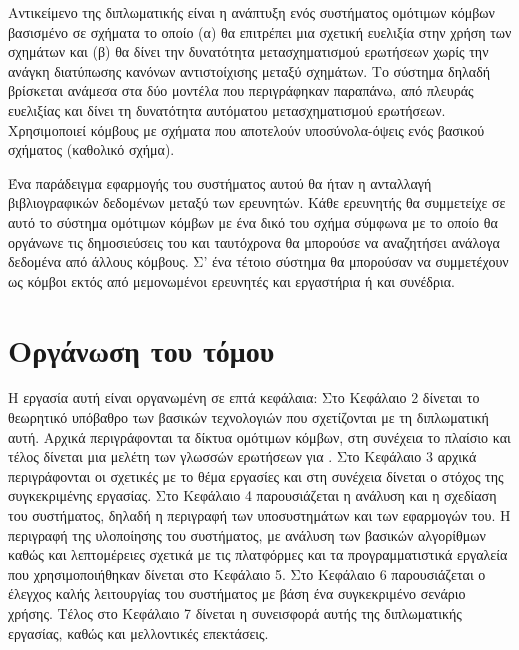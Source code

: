 Αντικείμενο της διπλωματικής είναι η ανάπτυξη ενός συστήματος
ομότιμων κόμβων βασισμένο σε σχήματα το οποίο (α) θα επιτρέπει μια
σχετική ευελιξία στην χρήση των σχημάτων και (β) θα δίνει την
δυνατότητα μετασχηματισμού ερωτήσεων χωρίς την ανάγκη διατύπωσης
κανόνων αντιστοίχισης μεταξύ σχημάτων. Το σύστημα δηλαδή βρίσκεται
ανάμεσα στα δύο μοντέλα που περιγράφηκαν παραπάνω, από πλευράς
ευελιξίας και δίνει τη δυνατότητα αυτόματου μετασχηματισμού
ερωτήσεων. Χρησιμοποιεί κόμβους με σχήματα  που αποτελούν
υποσύνολα-όψεις  ενός βασικού σχήματος (καθολικό
σχήμα).

Ένα παράδειγμα εφαρμογής του συστήματος αυτού θα ήταν η ανταλλαγή
βιβλιογραφικών δεδομένων μεταξύ των ερευνητών. Κάθε ερευνητής θα
συμμετείχε σε αυτό το σύστημα ομότιμων κόμβων με ένα δικό του
 σχήμα σύμφωνα με το οποίο θα οργάνωνε τις δημοσιεύσεις
του και ταυτόχρονα θα μπορούσε να αναζητήσει ανάλογα δεδομένα από
άλλους κόμβους. Σ' ένα τέτοιο σύστημα θα μπορούσαν να συμμετέχουν
ως κόμβοι εκτός από μεμονωμένοι ερευνητές και εργαστήρια ή και
συνέδρια.

\section{Οργάνωση του τόμου}
Η εργασία αυτή είναι οργανωμένη σε επτά κεφάλαια: Στο Κεφάλαιο 2
δίνεται το θεωρητικό υπόβαθρο των βασικών τεχνολογιών που
σχετίζονται με τη διπλωματική αυτή. Αρχικά περιγράφονται τα δίκτυα
ομότιμων κόμβων, στη συνέχεια το πλαίσιο  και τέλος
δίνεται μια μελέτη των γλωσσών ερωτήσεων για . Στο
Κεφάλαιο 3 αρχικά περιγράφονται οι σχετικές με το θέμα εργασίες
και στη συνέχεια δίνεται ο στόχος της συγκεκριμένης εργασίας. Στο
Κεφάλαιο 4 παρουσιάζεται η ανάλυση και η σχεδίαση του συστήματος,
δηλαδή η περιγραφή των υποσυστημάτων και των εφαρμογών του. Η
περιγραφή της υλοποίησης του συστήματος, με ανάλυση των βασικών
αλγορίθμων καθώς και λεπτομέρειες σχετικά με τις πλατφόρμες και τα
προγραμματιστικά εργαλεία που χρησιμοποιήθηκαν δίνεται στο
Κεφάλαιο 5. Στο Κεφάλαιο 6 παρουσιάζεται ο έλεγχος καλής
λειτουργίας του συστήματος με βάση ένα συγκεκριμένο σενάριο
χρήσης. Τέλος στο Κεφάλαιο 7 δίνεται η συνεισφορά αυτής της
διπλωματικής εργασίας, καθώς και μελλοντικές επεκτάσεις.